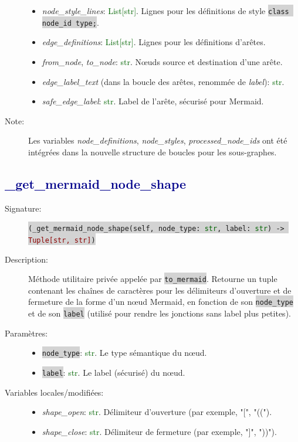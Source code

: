 \documentclass[11pt,a4paper]{article}
\newcommand{\code}[1]{\colorbox{lightgray}{\texttt{\small #1}}}
\newcommand{\var}[1]{\textit{#1}}
\newcommand{\vartype}[1]{\textcolor{darkgreen}{#1}}
\newcommand{\methodname}[1]{\textbf{\textcolor{darkblue}{#1}}}
\newcommand{\param}[1]{\code{#1}}
\newcommand{\rettype}[1]{\textcolor{darkred}{#1}}
\begin{document}
\begin{description}
\begin{itemize}
        \item \var{node\_style\_lines}: \vartype{List[str]}. Lignes pour les définitions de style \code{class node\_id type;}.
        \item \var{edge\_definitions}: \vartype{List[str]}. Lignes pour les définitions d'arêtes.
        \item \var{from\_node}, \var{to\_node}: \vartype{str}. Nœuds source et destination d'une arête.
        \item \var{edge\_label\_text} (dans la boucle des arêtes, renommée de \var{label}): \vartype{str}.
        \item \var{safe\_edge\_label}: \vartype{str}. Label de l'arête, sécurisé pour Mermaid.
    \end{itemize}
    \item[Note:] Les variables \var{node\_definitions}, \var{node\_styles}, \var{processed\_node\_ids} ont été intégrées dans la nouvelle structure de boucles pour les sous-graphes.
\end{description}

\subsection*{\methodname{\_get\_mermaid\_node\_shape}}
\begin{description}
    \item[Signature:] \code{(\_get\_mermaid\_node\_shape(self, node\_type: \vartype{str}, label: \vartype{str}) -> \rettype{Tuple[str, str]})}
    \item[Description:] Méthode utilitaire privée appelée par \code{to\_mermaid}. Retourne un tuple contenant les chaînes de caractères pour les délimiteurs d'ouverture et de fermeture de la forme d'un nœud Mermaid, en fonction de son \param{node\_type} et de son \param{label} (utilisé pour rendre les jonctions sans label plus petites).
    \item[Paramètres:]
    \begin{itemize}
        \item \param{node\_type}: \vartype{str}. Le type sémantique du nœud.
        \item \param{label}: \vartype{str}. Le label (sécurisé) du nœud.
    \end{itemize}
    \item[Variables locales/modifiées:]
    \begin{itemize}
        \item \var{shape\_open}: \vartype{str}. Délimiteur d'ouverture (par exemple, "[", "((").
        \item \var{shape\_close}: \vartype{str}. Délimiteur de fermeture (par exemple, "]", "))").
    \end{itemize}
\end{description}
\end{document}
